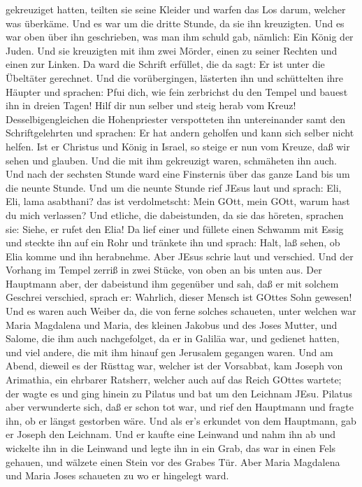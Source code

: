 gekreuziget hatten, teilten sie seine Kleider und warfen das Los darum,
welcher was überkäme.  Und es war um die dritte Stunde, da
sie ihn kreuzigten.  Und es war oben über ihn geschrieben,
was man ihm schuld gab, nämlich: Ein König der Juden.  Und
sie kreuzigten mit ihm zwei Mörder, einen zu seiner Rechten und einen
zur Linken.  Da ward die Schrift erfüllet, die da sagt: Er
ist unter die Übeltäter gerechnet.  Und die vorübergingen,
lästerten ihn und schüttelten ihre Häupter und sprachen: Pfui dich, wie
fein zerbrichst du den Tempel und bauest ihn in dreien Tagen!
 Hilf dir nun selber und steig herab vom Kreuz!
 Desselbigengleichen die Hohenpriester verspotteten ihn
untereinander samt den Schriftgelehrten und sprachen: Er hat andern
geholfen und kann sich selber nicht helfen.  Ist er
Christus und König in Israel, so steige er nun vom Kreuze, daß wir sehen
und glauben. Und die mit ihm gekreuzigt waren, schmäheten ihn auch.
 Und nach der sechsten Stunde ward eine Finsternis über das
ganze Land bis um die neunte Stunde.  Und um die neunte
Stunde rief JEsus laut und sprach: Eli, Eli, lama asabthani? das ist
verdolmetscht: Mein GOtt, mein GOtt, warum hast du mich verlassen?
 Und etliche, die dabeistunden, da sie das höreten,
sprachen sie: Siehe, er rufet den Elia!  Da lief einer und
füllete einen Schwamm mit Essig und steckte ihn auf ein Rohr und
tränkete ihn und sprach: Halt, laß sehen, ob Elia komme und ihn
herabnehme.  Aber JEsus schrie laut und verschied.
 Und der Vorhang im Tempel zerriß in zwei Stücke, von oben
an bis unten aus.  Der Hauptmann aber, der dabeistund ihm
gegenüber und sah, daß er mit solchem Geschrei verschied, sprach er:
Wahrlich, dieser Mensch ist GOttes Sohn gewesen!  Und es
waren auch Weiber da, die von ferne solches schaueten, unter welchen war
Maria Magdalena und Maria, des kleinen Jakobus und des Joses Mutter, und
Salome,  die ihm auch nachgefolget, da er in Galiläa war,
und gedienet hatten, und viel andere, die mit ihm hinauf gen Jerusalem
gegangen waren.  Und am Abend, dieweil es der Rüsttag war,
welcher ist der Vorsabbat,  kam Joseph von Arimathia, ein
ehrbarer Ratsherr, welcher auch auf das Reich GOttes wartete; der wagte
es und ging hinein zu Pilatus und bat um den Leichnam JEsu.
 Pilatus aber verwunderte sich, daß er schon tot war, und
rief den Hauptmann und fragte ihn, ob er längst gestorben wäre.
 Und als er's erkundet von dem Hauptmann, gab er Joseph den
Leichnam.  Und er kaufte eine Leinwand und nahm ihn ab und
wickelte ihn in die Leinwand und legte ihn in ein Grab, das war in einen
Fels gehauen, und wälzete einen Stein vor des Grabes Tür. 
Aber Maria Magdalena und Maria Joses schaueten zu wo er hingelegt ward.

